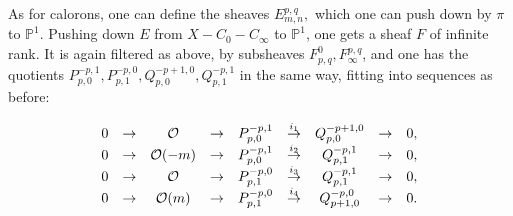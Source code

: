 \documentclass[12pt]{article}
\theoremstyle{definition}
\theoremstyle{remark}
\numberwithin{theorem}{section}
\def\bP{{\mathbb {P}}}
\def\pO{{\mathcal O}}
\begin{document}
 

As for calorons, one can define the sheaves $E_{m,n}^{p,q},$ which one can push down by $\pi$ to $\bP^1$. Pushing down $E$ from $X-C_0-C_\infty$ to $\bP^1$, one gets a  sheaf $F$ of infinite rank. It is again filtered as above, by subsheaves $F^0_{p,q},
F_\infty^{p,q}$, and one has the quotients $P_{p,0}^{-p,1},P_{p,1}^{-p,0} ,Q_{p,0}^{-p+1,0}, Q_{p,1}^{-p,1}$ in the same way, fitting into sequences as before:

\begin{equation}\label{sheaf-sequences-2.2} 
\begin{matrix}
0&\rightarrow& \pO &\rightarrow& P_{p,0}^{-p,1}& \buildrel {i_1}\over{\rightarrow}& Q_{p,0}^{-p+1,0}&\rightarrow&0,\cr
0&\rightarrow& \pO(-m)&\rightarrow& P_{p,0}^{-p,1}&\buildrel {i_2}\over{\rightarrow}& Q_{p,1}^{-p ,1}&\rightarrow&0,  \cr
0&\rightarrow& \pO &\rightarrow& P_{p,1}^{-p,0}& \buildrel {i_3}\over{\rightarrow}& Q_{p,1}^{-p ,1}&\rightarrow&0, \cr
0&\rightarrow& \pO(m) &\rightarrow& P_{p,1}^{-p,0}& \buildrel {i_4}\over{\rightarrow}& Q_{p+1,0}^{-p,0}&\rightarrow&0.  \cr
\end{matrix}
\end{equation}
\end{document}
